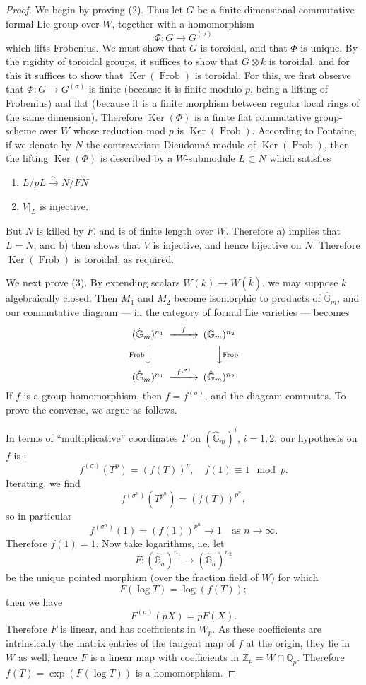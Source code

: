 \documentclass[12pt,a4paper]{article}
\theoremstyle{plain}
\theoremstyle{definition}
\theoremstyle{remark}
\DeclareMathOperator{\Ker}{Ker}
\DeclareMathOperator{\Frob}{Frob}
\providecommand{\Ker}{\operatorname{Ker}}
\begin{document}
\begin{proof}
We begin by proving (2). Thus let $G$ be a finite-dimensional commutative formal Lie group over $W$, together with a homomorphism
\[
\Phi : G \longrightarrow G^{(\sigma)}
\]
which lifts Frobenius. We must show that $G$ is toroidal, and that $\Phi$ is unique. By the rigidity of toroidal groups, it suffices to show that $G \otimes k$ is toroidal, and for this it suffices to show that $\Ker(\Frob)$ is toroidal. For this, we first observe that $\Phi : G \to G^{(\sigma)}$ is finite (because it is finite modulo $p$, being a lifting of Frobenius) and flat (because it is a finite morphism between regular local rings of the same dimension). Therefore $\Ker(\Phi)$ is a finite flat commutative group-scheme over $W$ whose reduction mod $p$ is $\Ker(\Frob)$. According to Fontaine, if we denote by $N$ the contravariant Dieudonn\'e module of $\Ker(\Frob)$, then the lifting $\Ker(\Phi)$ is described by a $W$-submodule $L \subset N$ which satisfies
\begin{enumerate}[label=\alph*)]
\item $L/pL \xrightarrow{\sim} N/FN$
\item $V|_L$ is injective.
\end{enumerate}
But $N$ is killed by $F$, and is of finite length over $W$. Therefore a) implies that $L = N$, and b) then shows that $V$ is injective, and hence bijective on $N$. Therefore $\Ker(\Frob)$ is toroidal, as required.

We next prove (3). By extending scalars $W(k) \to W(\bar{k})$, we may suppose $k$ algebraically closed. Then $M_1$ and $M_2$ become isomorphic to products of $\hat{\mathbb{G}}_m$, and our commutative diagram --- in the category of formal Lie varieties --- becomes
\[
\begin{CD}
(\hat{\mathbb{G}}_m)^{n_1} @>{f}>> (\hat{\mathbb{G}}_m)^{n_2} \\
@V{\Frob}VV @VV{\Frob}V \\
(\hat{\mathbb{G}}_m)^{n_1} @>{f^{(\sigma)}}>> (\hat{\mathbb{G}}_m)^{n_2}
\end{CD}
\]
If $f$ is a group homomorphism, then $f = f^{(\sigma)}$, and the diagram commutes. To prove the converse, we argue as follows.

In terms of ``multiplicative'' coordinates $T$ on $(\hat{\mathbb{G}}_m)^i$, $i = 1, 2$, our hypothesis on $f$ is :
\[
f^{(\sigma)}(T^p) = (f(T))^p, \quad f(1) \equiv 1 \mod p.
\]
Iterating, we find
\[
f^{(\sigma^n)}(T^{p^n}) = (f(T))^{p^n},
\]
so in particular
\[
f^{(\sigma^n)}(1) = (f(1))^{p^n} \to 1 \quad \text{as } n \to \infty.
\]
Therefore $f(1) = 1$. Now take logarithms, i.e. let
\[
F : (\hat{\mathbb{G}}_a)^{n_1} \longrightarrow (\hat{\mathbb{G}}_a)^{n_2}
\]
be the unique pointed morphism (over the fraction field of $W$) for which
\[
F(\log T) = \log(f(T));
\]
then we have
\[
F^{(\sigma)}(pX) = pF(X).
\]
Therefore $F$ is linear, and has coefficients in $W_p$. As these coefficients are intrinsically the matrix entries of the tangent map of $f$ at the origin, they lie in $W$ as well, hence $F$ is a linear map with coefficients in $\mathbb{Z}_p = W \cap \mathbb{Q}_p$. Therefore $f(T) = \exp(F(\log T))$ is a homomorphism.


\end{proof}
\end{document}
